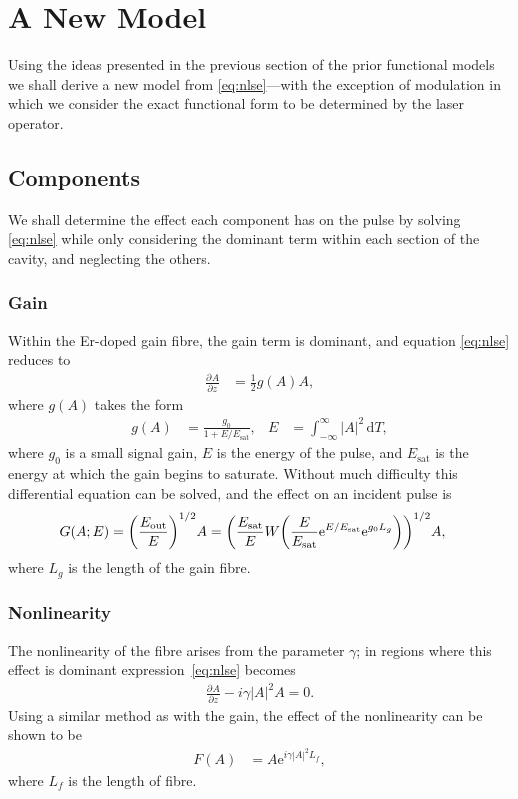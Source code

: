 \documentclass[graybox]{svmult}
\let\originalleft\left
\let\originalright\right
\renewcommand{\left}{\mathopen{}\mathclose\bgroup\originalleft}
\renewcommand{\right}{\aftergroup\egroup\originalright}
\providecommand{\df}{\textrm{d}}
\newcommand{\pdiff}[3][]{\frac{\partial^{#1}#2}{\partial{#3}^{#1}}}
\newcommand{\Es}{E_{\textrm{sat}}}
\begin{document}
\section{A New Model}
\label{sec:newmodel}
Using the ideas presented in the previous section of the prior functional models \cite{burgoyne2014, cutler, kuizenga1970a, kuizenga1970b, kuizenga1970, martinez1984, martinez1985, siegman} we shall derive a new model from \eqref{eq:nlse}---with the exception of modulation in which we consider the exact functional form to be determined by the laser operator.

\subsection{Components}
We shall determine the effect each component has on the pulse by solving \eqref{eq:nlse} while only considering the dominant term within each section of the cavity, and neglecting the others.

\subsubsection{Gain}
Within the Er-doped gain fibre, the gain term is dominant, and equation \eqref{eq:nlse} reduces to
\begin{align}
	\label{eq:gainde}
	\pdiff{A}{z} &= \frac{1}{2} g(A) A,
\end{align}
where $g(A)$ takes the form \cite{bohun, burgoyne2014, haus1975, hausbook, haus1992, haus2000, haus1991, kartner, peng, shtyrina, silfvast, usechak, yarutkina}
\begin{align}
	\label{eq:energy}
	g(A) &= \frac{g_0}{1 + E / \Es},& E &= \int_{-\infty}^\infty |A|^2 \, \df T,
\end{align}
where $g_0$ is a small signal gain, $E$ is the energy of the pulse, and $\Es$ is the energy at which the gain begins to saturate. Without much difficulty this differential equation can be solved, and the effect on an incident pulse is
\begin{align}
	G(A;E) &= \left(\frac{E_{\textrm{out}}}{E}\right)^{1/2}A = \left( \frac{\Es}{E} W \left( \frac{E}{\Es} \textrm{e}^{E/\Es} \textrm{e}^{g_0 L_g} \right) \right)^{1/2} A,
\end{align}
where $L_g$ is the length of the gain fibre.

\subsubsection{Nonlinearity}
The nonlinearity of the fibre arises from the parameter $\gamma$; in regions where this effect is dominant expression~\eqref{eq:nlse} becomes
\begin{align}
	\label{eq:fibrediff}
	\pdiff{A}{z} - i \gamma |A|^2 A = 0.
\end{align}
Using a similar method as with the gain, the effect of the nonlinearity can be shown to be
\begin{align}
	F(A) &= A \textrm{e}^{i \gamma |A|^2 L_f},
\end{align}
where $L_f$ is the length of fibre.
\end{document}

